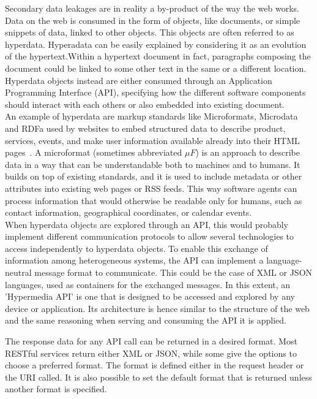 Secondary data leakages are in reality a by-product of the way the web works. Data on the web is consumed in the form of objects, like documents, or simple snippets of data, linked to other objects. This objects are often referred to as hyperdata. Hyperadata can be easily explained by considering it as an evolution of the hypertext.Within a hypertext document in fact, paragraphs composing the document could be linked to some other text in the same or a different location. Hyperdata objects instead are either consumed through an Application Programming Interface (API), specifying how the different software components should interact with each others or also embedded into existing document.\\

An example of hyperdata are markup standards like Microformats, Microdata and RDFa used by websites to embed structured data to describe product, services, events, and make user information available already into their HTML pages~\cite{bizer2013deployment}. A microformat (sometimes abbreviated $\mu F$) is an approach to describe data in a way that can be understandable both to machines and to humans. It builds on top of existing standards, and it is used to include metadata or other attributes into existing web pages or RSS feeds. This way software agents can process information that would otherwise be readable only for humans, such as contact information, geographical coordinates, or calendar events.\\

When hyperdata objects are explored through an API, this would probably implement different communication protocols to allow several technologies to access independently to hyperdata objects. To enable this exchange of information among heterogeneous systems, the API can implement a language­-neutral message format to communicate. This could be the case of XML or JSON languages, used as containers for the exchanged messages. In this extent, an 'Hypermedia API' is one that is designed to be accessed and explored by any device or application. Its architecture is hence similar to the structure of the web and the same reasoning when serving and consuming the API it is applied. 

The response data for any API call can be returned in a desired format. Most RESTful services return either XML or JSON, while some give the options to choose a preferred format. The format is defined either in the request header or the URI called. It is also possible to set the default format that is returned unless another format is specified.


